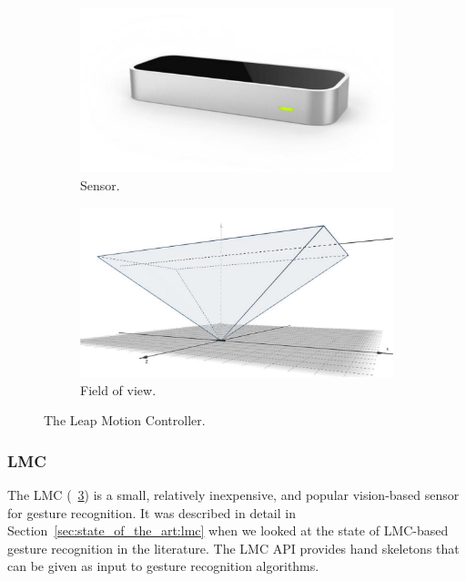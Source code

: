 \begin{figure}[!b]
    \centering
    \begin{subfigure}{.46\linewidth}
        \centering
        \includegraphics[width=\linewidth]{Figures/RadarExperiments/Sensors/lmc.pdf}
        \captionsetup{width=.99\linewidth}
        \caption{Sensor.}
        \label{fig:radar-experiments:lmc:product}
    \end{subfigure}
    \begin{subfigure}{.46\linewidth}
        \centering
        \includegraphics[width=\linewidth,trim={0.2cm 0.2cm 0.2cm 1.5cm},clip]{Figures/RadarExperiments/Sensors/lmc-fov.pdf}
        \captionsetup{width=.99\linewidth}
        \caption{Field of view.}
        \label{fig:radar-experiments:lmc:fov}
    \end{subfigure}
    \caption{The Leap Motion Controller.}
    \label{fig:radar-experiments:lmc}
\end{figure}

\subsubsection{LMC}
The LMC (\fig~\ref{fig:radar-experiments:lmc}) is a small, relatively inexpensive, and popular vision-based sensor for gesture recognition. It was described in detail in Section~\ref{sec:state_of_the_art:lmc} when we looked at the state of LMC-based gesture recognition in the literature. The LMC API provides hand skeletons that can be given as input to gesture recognition algorithms.

